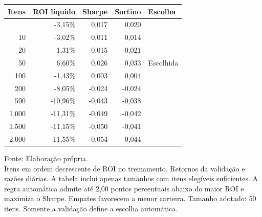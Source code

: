 \begingroup
\setlength{}
\setlength{}
\fontsize{12.0pt}{14.4pt}\selectfont

\setlength{\LTpost}{0mm}
\begin{longtable}{@{\extracolsep{\fill}}rrrrl}

\toprule
\textbf{Itens} & \textbf{ROI líquido} & \textbf{Sharpe} & \textbf{Sortino} & \textbf{Escolha} \\ 
\midrule\addlinespace[2.5pt]
5 & -3,15\% & 0,017 & 0,020 &  \\
10 & -3,02\% & 0,011 & 0,014 &  \\
20 & 1,31\% & 0,015 & 0,021 &  \\
50 & 6,60\% & 0,026 & 0,033 & Escolhida \\
100 & -1,43\% & 0,003 & 0,004 &  \\
200 & -8,05\% & -0,024 & -0,024 &  \\
500 & -10,96\% & -0,043 & -0,038 &  \\
1.000 & -11,31\% & -0,049 & -0,042 &  \\
1.500 & -11,15\% & -0,050 & -0,041 &  \\
2.000 & -11,55\% & -0,054 & -0,044 &  \\
\bottomrule
\end{longtable}
\begin{minipage}{\linewidth}
Fonte: Elaboração própria.\\
Itens em ordem decrescente de ROI no treinamento. Retornos da validação e razões diárias. A tabela inclui apenas tamanhos com itens elegíveis suficientes. A regra automática admite até 2,00 pontos percentuais abaixo do maior ROI e maximiza o Sharpe. Empates favorecem a menor carteira. Tamanho adotado: 50 itens. Somente a validação define a escolha automática.\\
\end{minipage}
\endgroup
